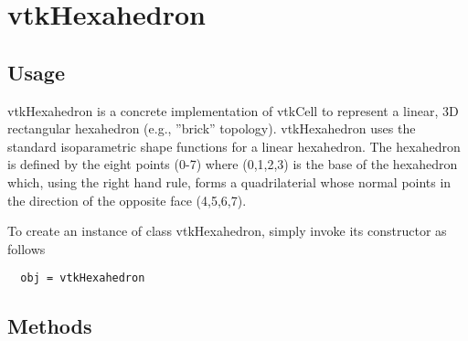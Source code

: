 \section{vtkHexahedron}

\subsection{Usage}

 vtkHexahedron is a concrete implementation of vtkCell to represent a
 linear, 3D rectangular hexahedron (e.g., ''brick'' topology). vtkHexahedron
 uses the standard isoparametric shape functions for a linear
 hexahedron. The hexahedron is defined by the eight points (0-7) where
 (0,1,2,3) is the base of the hexahedron which, using the right hand rule,
 forms a quadrilaterial whose normal points in the direction of the
 opposite face (4,5,6,7).

To create an instance of class vtkHexahedron, simply
invoke its constructor as follows
\begin{verbatim}
  obj = vtkHexahedron
\end{verbatim}
\subsection{Methods}

